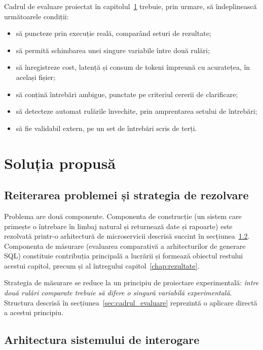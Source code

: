 \documentclass[12pt,a4paper]{report}
\begin{document}
Cadrul de evaluare proiectat în capitolul~\ref{chap:solutie} trebuie, prin urmare, să
îndeplinească următoarele condiții:

\begin{itemize}[nosep,leftmargin=*]
  \item să puncteze prin execuție reală, comparând seturi de rezultate;
  \item să permită schimbarea unei singure variabile între două rulări;
  \item să înregistreze cost, latență și consum de tokeni împreună cu
    acuratețea, în același fișier;
  \item să conțină întrebări ambigue, punctate pe criteriul cererii de
    clarificare;
  \item să detecteze automat rulările învechite, prin amprentarea setului de
    întrebări;
  \item să fie validabil extern, pe un set de întrebări scris de terți.
\end{itemize}

\chapter{Soluția propusă}
\label{chap:solutie}

\section{Reiterarea problemei și strategia de rezolvare}

Problema are două componente. Componenta de construcție (un sistem care primește o întrebare în limbaj
natural și returnează date și rapoarte) este rezolvată printr-o arhitectură
de microservicii descrisă succint în secțiunea~\ref{sec:arhitectura}. Componenta de măsurare (evaluarea
comparativă a arhitecturilor de generare SQL) constituie contribuția principală a lucrării
și formează obiectul restului acestui capitol, precum și al întregului capitol~\ref{chap:rezultate}.

Strategia de măsurare se reduce la un principiu de proiectare
experimentală: \emph{între două rulări comparate trebuie să difere o singură
variabilă experimentală}. Structura descrisă în secțiunea~\ref{sec:cadrul_evaluare} reprezintă o aplicare directă a acestui principiu.

\section{Arhitectura sistemului de interogare}
\label{sec:arhitectura}
\end{document}
